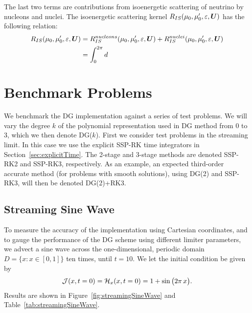 \documentclass[10pt,preprint]{aastex}
\begin{document}
The last two terms are contributions from isoenergetic scattering of neutrino by nucleons and nuclei. The isoenergetic scattering kernel $R_{IS}(\mu_0, \mu^\prime_0, \varepsilon,\boldsymbol{U})$ has the following relation:
\begin{align}
R_{IS}(\mu_0, \mu^\prime_0, \varepsilon,\boldsymbol{U}) & = R_{IS}^{nucleons}(\mu_0, \mu^\prime_0, \varepsilon,\boldsymbol{U}) +  R_{IS}^{nuclei}(\mu_0, \mu^\prime_0, \varepsilon,\boldsymbol{U})\\
& = \int_{0}^{2\pi}d
\end{align}
\clearpage

\section{Benchmark Problems}

We benchmark the DG implementation against a series of test problems.  
We will vary the degree $k$ of the polynomial representation used in DG method from 0 to 3, which we then denote DG($k$).  
First we consider test problems in the streaming limit.  
In this case we use the explicit SSP-RK time integrators in Section~\ref{sec:explicitTime}.  
The 2-stage and 3-stage methods are denoted SSP-RK2 and SSP-RK3, respectively.  
As an example, an expected third-order accurate method (for problems with smooth solutions), using DG(2) and SSP-RK3, will then be denoted DG(2)+RK3.  

\subsection{Streaming Sine Wave}

To measure the accuracy of the implementation using Cartesian coordinates, and to gauge the performance of the DG scheme using different limiter parameters, we advect a sine wave across the one-dimensional, periodic domain $D=\{x:x\in[0,1]\}$ ten times, until $t=10$.  
We let the initial condition be given by
\begin{equation}
  \mathcal{J}(x,t=0)=\mathcal{H}_{x}(x,t=0)=1+\sin\big(2\pi\,x\big).  
\end{equation}
Results are shown in Figure~\ref{fig:streamingSineWave} and Table~\ref{tab:streamingSineWave}.  
\end{document}
